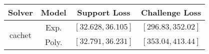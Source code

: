 \begin{tabular}{cc|c|c} 
\hline 
 Solver & Model & Support Loss  & Challenge Loss \tabularnewline\hline 
\hline 
\multirow{2}{*}{cachet} & Exp. & $\mathbf{\left[32.628,36.105\right]}$ & $\mathbf{\left[296.83,352.02\right]}$ \tabularnewline 
 & Poly. & $\left[32.791,36.231\right]$ & $\left[353.04,413.44\right]$ \tabularnewline 
\hline 
\end{tabular} 

